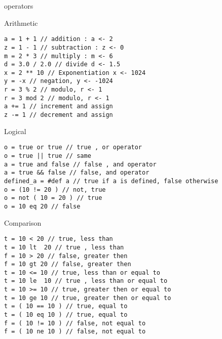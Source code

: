 \begin{section}{operators}


\begin{subsection}{Arithmetic}

\begin{center}\begin{minipage}{\linewidth}
\begin{lstlisting}[style=JexlStyle]
a = 1 + 1 // addition : a <- 2
z = 1 - 1 // subtraction : z <- 0
m = 2 * 3 // multiply : m <- 6
d = 3.0 / 2.0 // divide d <- 1.5   
x = 2 ** 10 // Exponentiation x <- 1024
y = -x // negation, y <- -1024 
r = 3 % 2 // modulo, r <- 1 
r = 3 mod 2 // modulo, r <- 1    
a += 1 // increment and assign 
z -= 1 // decrement and assign 
\end{lstlisting}
\end{minipage}\end{center}

\end{subsection}

\begin{subsection}{Logical}
\begin{lstlisting}[style=JexlStyle]
o = true or true // true , or operator 
o = true || true // same 
a = true and false // false , and operator 
a = true && false // false, and operator  
defined_a = #def a // true if a is defined, false otherwise
o = (10 != 20 ) // not, true 
o = not ( 10 = 20 ) // true 
o = 10 eq 20 // false
\end{lstlisting}

\end{subsection}


\begin{subsection}{Comparison}
\begin{lstlisting}[style=JexlStyle]
t = 10 < 20 // true, less than
t = 10 lt  20 // true , less than 
f = 10 > 20 // false, greater then 
f = 10 gt 20 // false, greater then 
t = 10 <= 10 // true, less than or equal to 
t = 10 le  10 // true , less than or equal to 
t = 10 >= 10 // true, greater then or equal to 
t = 10 ge 10 // true, greater then or equal to 
t = ( 10 == 10 ) // true, equal to 
t = ( 10 eq 10 ) // true, equal to 
f = ( 10 != 10 ) // false, not equal to 
f = ( 10 ne 10 ) // false, not equal to 
\end{lstlisting}
\end{subsection}


\end{section}
